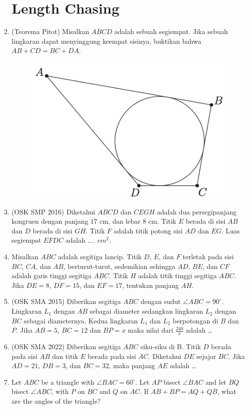 \documentclass[12pt]{article}
\begin{document}
\begin{CJK*}{UTF8}{min}
\begin{enumerate}
\section{Length Chasing}
    \item (Teorema Pitot) Misalkan $ABCD$ adalah sebuah segiempat. Jika sebuah lingkaran dapat menyinggung keempat sisinya, buktikan bahwa $AB + CD = BC + DA$.
    \begin{figure}[H]
        \includegraphics[width=0.4\linewidth]{0Figure/pitot-theorem.png}
    \end{figure}
    
    \item (OSK SMP 2016) Diketahui $ABCD$ dan $CEGH$ adalah dua persegipanjang kongruen dengan panjang $17$ cm, dan lebar $8$ cm. Titik $E$ berada di sisi $AB$ dan $D$ berada di sisi $GH$. Titik $F$ adalah titik potong sisi $AD$ dan $EG$. Luas segiempat $EFDC$ adalah .... $cm^2$.

    \item Misalkan $ABC$ adalah segitiga lancip. Titik $D$, $E$, dan $F$ terletak pada sisi $BC$, $CA$, dan $AB$, berturut-turut, sedemikian sehingga $AD$, $BE$, dan $CF$ adalah garis tinggi segitiga $ABC$. Titik $H$ adalah titik tinggi segitiga $ABC$. Jika $DE = 8$, $DF = 15$, dan $EF = 17$, tentukan panjang $AH$.

    \item (OSK SMA 2015) Diberikan segitiga $ABC$ dengan sudut $\angle ABC = 90^\circ$. Lingkaran $L_1$ dengan $AB$ sebagai diameter sedangkan lingkaran $L_2$ dengan $BC$ sebagai diameternya. Kedua lingkaran $L_1$ dan $L_2$ berpotongan di $B$ dan $P$. Jika $AB = 5$, $BC = 12$ dan $BP = x$ maka nilai dari $\frac{240}{x}$ adalah \ldots

    \item (OSK SMA 2022) Diberikan segitiga $ABC$ siku-siku di B. Titik $D$ berada pada sisi $AB$ dan titik $E$ berada pada sisi $AC$. Diketahui $DE$ sejajar $BC$. Jika $AD = 21$, $DB = 3$, dan $BC = 32$, maka panjang $AE$ adalah \dots
    
    \item Let $ABC$ be a triangle with $\angle BAC = 60^\circ$. Let $AP$ bisect $\angle BAC$ and let $BQ$ bisect $\angle ABC$, with $P$ on $BC$ and $Q$ on $AC$. If $AB + BP = AQ + QB$, what are the angles of the triangle?


\end{enumerate}
\end{CJK*}
\end{document}
